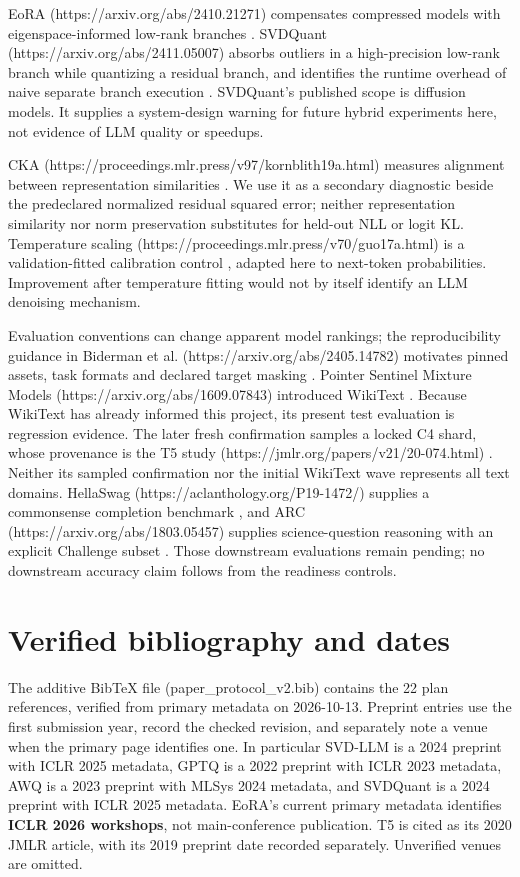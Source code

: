 \documentclass[10pt]{article}
\begin{document}
EoRA (https://arxiv.org/abs/2410.21271) compensates compressed models with
eigenspace-informed low-rank branches \cite{liu2024eora}.
SVDQuant (https://arxiv.org/abs/2411.05007) absorbs outliers in a high-precision
low-rank branch while quantizing a residual branch, and identifies the runtime
overhead of naive separate branch execution \cite{li2024svdquant}. SVDQuant's
published scope is diffusion models. It supplies a system-design warning for
future hybrid experiments here, not evidence of LLM quality or speedups.

CKA (https://proceedings.mlr.press/v97/kornblith19a.html) measures alignment
between representation similarities \cite{kornblith2019cka}. We use it as a
secondary diagnostic beside the predeclared normalized residual squared error;
neither representation similarity nor norm preservation substitutes for held-out
NLL or logit KL. Temperature scaling (https://proceedings.mlr.press/v70/guo17a.html)
is a validation-fitted calibration control \cite{guo2017calibration}, adapted here
to next-token probabilities. Improvement after temperature fitting would not
by itself identify an LLM denoising mechanism.

Evaluation conventions can change apparent model rankings; the reproducibility
guidance in Biderman et al. (https://arxiv.org/abs/2405.14782) motivates pinned
assets, task formats and declared target masking \cite{biderman2024evaluation}.
Pointer Sentinel Mixture Models (https://arxiv.org/abs/1609.07843) introduced
WikiText \cite{merity2016wikitext}. Because WikiText has already informed this
project, its present test evaluation is regression evidence. The later fresh
confirmation samples a locked C4 shard, whose provenance is the
T5 study (https://jmlr.org/papers/v21/20-074.html) \cite{raffel2020t5}. Neither its
sampled confirmation nor the initial WikiText wave represents all text domains.
HellaSwag (https://aclanthology.org/P19-1472/) supplies a commonsense completion
benchmark \cite{zellers2019hellaswag}, and ARC (https://arxiv.org/abs/1803.05457)
supplies science-question reasoning with an explicit Challenge subset
\cite{clark2018arc}. Those downstream evaluations remain pending; no downstream
accuracy claim follows from the readiness controls.

\section{Verified bibliography and dates}

The additive BibTeX file (paper\_protocol\_v2.bib) contains the 22 plan references,
verified from primary metadata on 2026-10-13. Preprint entries use the first
submission year, record the checked revision, and separately note a venue when
the primary page identifies one. In particular SVD-LLM is a 2024 preprint with
ICLR 2025 metadata, GPTQ is a 2022 preprint with ICLR 2023 metadata, AWQ is a
2023 preprint with MLSys 2024 metadata, and SVDQuant is a 2024 preprint with ICLR
2025 metadata. EoRA's current primary metadata identifies \textbf{ICLR 2026 workshops},
not main-conference publication. T5 is cited as its 2020 JMLR article, with its
2019 preprint date recorded separately. Unverified venues are omitted.
\end{document}

